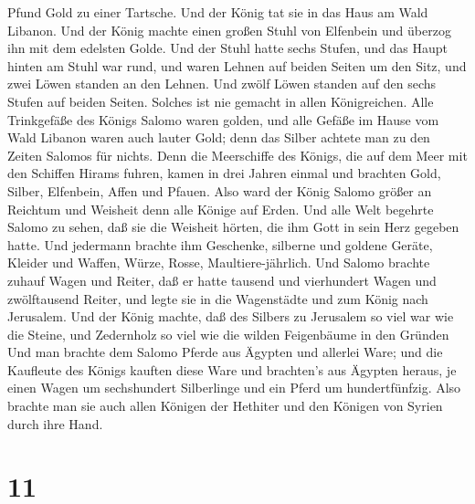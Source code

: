 Pfund Gold zu einer Tartsche. Und der König tat sie in das Haus am Wald
Libanon.  Und der König machte einen großen Stuhl von
Elfenbein und überzog ihn mit dem edelsten Golde.  Und der
Stuhl hatte sechs Stufen, und das Haupt hinten am Stuhl war rund, und
waren Lehnen auf beiden Seiten um den Sitz, und zwei Löwen standen an
den Lehnen.  Und zwölf Löwen standen auf den sechs Stufen
auf beiden Seiten. Solches ist nie gemacht in allen Königreichen.
 Alle Trinkgefäße des Königs Salomo waren golden, und alle
Gefäße im Hause vom Wald Libanon waren auch lauter Gold; denn das Silber
achtete man zu den Zeiten Salomos für nichts.  Denn die
Meerschiffe des Königs, die auf dem Meer mit den Schiffen Hirams fuhren,
kamen in drei Jahren einmal und brachten Gold, Silber, Elfenbein, Affen
und Pfauen.  Also ward der König Salomo größer an Reichtum
und Weisheit denn alle Könige auf Erden.  Und alle Welt
begehrte Salomo zu sehen, daß sie die Weisheit hörten, die ihm Gott in
sein Herz gegeben hatte.  Und jedermann brachte ihm
Geschenke, silberne und goldene Geräte, Kleider und Waffen, Würze,
Rosse, Maultiere-jährlich.  Und Salomo brachte zuhauf Wagen
und Reiter, daß er hatte tausend und vierhundert Wagen und zwölftausend
Reiter, und legte sie in die Wagenstädte und zum König nach Jerusalem.
 Und der König machte, daß des Silbers zu Jerusalem so viel
war wie die Steine, und Zedernholz so viel wie die wilden Feigenbäume in
den Gründen  Und man brachte dem Salomo Pferde aus Ägypten
und allerlei Ware; und die Kaufleute des Königs kauften diese Ware
 und brachten's aus Ägypten heraus, je einen Wagen um
sechshundert Silberlinge und ein Pferd um hundertfünfzig. Also brachte
man sie auch allen Königen der Hethiter und den Königen von Syrien durch
ihre Hand.

\hypertarget{section-10}{%
\section{11}\label{section-10}}

